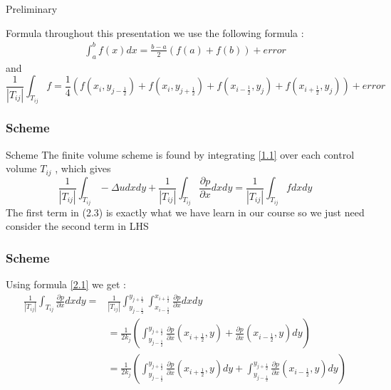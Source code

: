 \documentclass[11pt]{beamer}
\numberwithin{equation}{section}
\theoremstyle{plain}
\theoremstyle{definition}
\theoremstyle{remark}
\begin{document}
\begin{frame}{Preliminary}
\begin{block}{Formula}
throughout this presentation we use the following formula : 
\begin{align}
\int_a^bf(x)dx=\frac{b-a}{2}(f(a)+f(b)) + error \label{2.1}
\end{align}
and 
\begin{equation*}
\frac{1}{|T_{ij}|}\int_{T_{ij}}f=\frac{1}{4}\left ( f(x_i,y_{j-\frac{1}{2}})+f(x_i,y_{j+\frac{1}{2}})+f(x_{i-\frac{1}{2}},y_{j})+f(x_{i+\frac{1}{2}},y_{j})  \right ) +error
\end{equation*}
\end{block}
\end{frame}

\begin{frame}\frametitle{Scheme}
\begin{block}{Scheme}
The finite volume scheme is found by integrating \ref{1.1} over each control volume $T_{ij}$ , which gives
\begin{equation}
\frac{1}{|T_{ij}|}\int_{T_{ij}}-\Delta udxdy+\frac{1}{|T_{ij}|}\int_{T_{ij}} \frac{\partial p}{\partial x}dxdy=\frac{1}{|T_{ij}|}\int_{T_{ij}} fdxdy 
\end{equation}
The first term in (2.3) is exactly what we have learn in our course so we just need consider the second term in LHS
\end{block}
\end{frame}
\begin{frame}\frametitle{Scheme}
Using formula \ref{2.1} we get : 
\begin{align*}
\frac{1}{|T_{ij}|}\int_{T_{ij}} \frac{\partial p}{\partial x}dxdy =& \frac{1}{|T_{ij}|} \int_{y_{j-\frac{1}{2}}}^{y_{j+\frac{1}{2}}} \int_{x_{i-\frac{1}{2}}}^{x_{i+\frac{1}{2}}} \frac{\partial p}{\partial x}dxdy  \\
&= \frac{1}{2k_j} \left ( \int_{y_{j-\frac{1}{2}}}^{y_{j+\frac{1}{2}}} \frac{\partial p}{\partial x}(x_{i+\frac{1}{2}},y)+\frac{\partial p}{\partial x}(x_{i-\frac{1}{2}},y)dy \right ) \\
& = \frac{1}{2k_j} \left ( \int_{y_{j-\frac{1}{2}}}^{y_{j+\frac{1}{2}}} \frac{\partial p}{\partial x}(x_{i+\frac{1}{2}},y)dy+\int_{y_{j-\frac{1}{2}}}^{y_{j+\frac{1}{2}}}    \frac{\partial p}{\partial x}(x_{i-\frac{1}{2}},y)dy \right )
\end{align*}
\end{frame}
\end{document}
